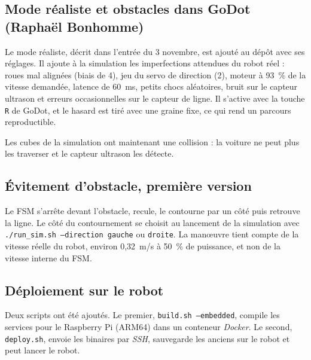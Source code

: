 \subsection{Mode réaliste et obstacles dans GoDot (Raphaël Bonhomme)}
Le mode réaliste, décrit dans l'entrée du 3 novembre, est ajouté au dépôt avec ses réglages. Il ajoute à la simulation les imperfections attendues du robot réel : roues mal alignées (biais de 4\degree{}), jeu du servo de direction (2\degree{}), moteur à 93~\% de la vitesse demandée, latence de 60~ms, petits chocs aléatoires, bruit sur le capteur ultrason et erreurs occasionnelles sur le capteur de ligne.
Il s'active avec la touche \texttt{R} de GoDot, et le hasard est tiré avec une graine fixe, ce qui rend un parcours reproductible.

Les cubes de la simulation ont maintenant une collision : la voiture ne peut plus les traverser et le capteur ultrason les détecte.

\subsection{Évitement d'obstacle, première version}
Le FSM s'arrête devant l'obstacle, recule, le contourne par un côté puis retrouve la ligne.
Le côté du contournement se choisit au lancement de la simulation avec \texttt{./run\_sim.sh --direction gauche} ou \texttt{droite}.
La manœuvre tient compte de la vitesse réelle du robot, environ 0,32~m/s à 50~\% de puissance, et non de la vitesse interne du FSM.

\subsection{Déploiement sur le robot}
Deux scripts ont été ajoutés.
Le premier, \texttt{build.sh --embedded}, compile les services pour le Raspberry Pi (ARM64) dans un conteneur \textit{Docker}.
Le second, \texttt{deploy.sh}, envoie les binaires par \textit{SSH}, sauvegarde les anciens sur le robot et peut lancer le robot.

